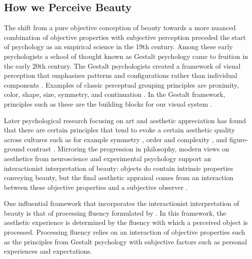 \documentclass[../main.tex]{subfiles}
\begin{document}
\subsection{How we Perceive Beauty}
The shift from a pure objective conception of beauty towards a more nuanced combination of objective properties with subjective perception preceded the start of psychology as an empirical science in the 19th century. Among these early psychologists a school of thought known as Gestalt psychology came to fruition in the early 20th century. The Gestalt psychologists created a framework of visual perception that emphasizes patterns and configurations rather than individual components \parencite{wagemansCenturyGestaltPsychology2012a}. Examples of classic perceptual grouping principles are proximity, color, shape, size, symmetry, and continuation \parencite{wertheimer1923laws, brooks2015traditional}. In the Gestalt framework, principles such as these are the building blocks for our visual system \parencite{wagemansCenturyGestaltPsychology2012a}.

Later psychological research focusing on art and aesthetic appreciation has found that there are  certain principles that tend to evoke a certain aesthetic quality across cultures such as for example symmetry \parencite{bodeCrossculturalComparisonPreference2017}, order and complexity \parencite{vangeert2021order}, and figure-ground contrast \parencite{reberProcessingFluencyAesthetic2004}. Mirroring the progression in philosophy, modern views on aesthetics from neuroscience and experimental psychology support an interactionist interpretation of beauty: objects do contain intrinsic properties conveying beauty, but the final aesthetic appraisal comes from an interaction between these objective properties and a subjective observer \parencite{valenziseAdvancesChallengesComputational2022}.

One influential framework that incorporates the interactionist interpretation of beauty is that of processing fluency formulated by \textcite{reberProcessingFluencyAesthetic2004}. In this framework, the aesthetic experience is determined by the fluency with which a perceived object is processed. Processing fluency relies on an interaction of objective properties such as the principles from Gestalt psychology with subjective factors such as personal experiences and expectations.

\end{document}
